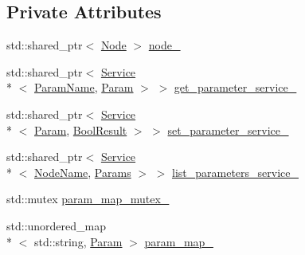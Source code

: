 \subsection*{Private Attributes}
\begin{DoxyCompactItemize}
\item 
std\-::shared\-\_\-ptr$<$ \hyperlink{classapollo_1_1cyber_1_1Node}{Node} $>$ \hyperlink{classapollo_1_1cyber_1_1ParameterServer_aff97f5c8d606d874176a4a547be55a8b}{node\-\_\-}
\item 
std\-::shared\-\_\-ptr$<$ \hyperlink{classapollo_1_1cyber_1_1Service}{Service}\\*
$<$ \hyperlink{classapollo_1_1cyber_1_1ParameterServer_a9a36f8371c476a478cbce477c443aa16}{Param\-Name}, \hyperlink{classapollo_1_1cyber_1_1ParameterServer_aabdbb6b8047a5748cb9e4f336650e303}{Param} $>$ $>$ \hyperlink{classapollo_1_1cyber_1_1ParameterServer_adf90630f82004589b443f9c24b66f230}{get\-\_\-parameter\-\_\-service\-\_\-}
\item 
std\-::shared\-\_\-ptr$<$ \hyperlink{classapollo_1_1cyber_1_1Service}{Service}\\*
$<$ \hyperlink{classapollo_1_1cyber_1_1ParameterServer_aabdbb6b8047a5748cb9e4f336650e303}{Param}, \hyperlink{classapollo_1_1cyber_1_1ParameterServer_a603661a34f7d6cff05fb6cf5618b96b9}{Bool\-Result} $>$ $>$ \hyperlink{classapollo_1_1cyber_1_1ParameterServer_a2f6c6c91e98fd38bbc3dfdbee24746d3}{set\-\_\-parameter\-\_\-service\-\_\-}
\item 
std\-::shared\-\_\-ptr$<$ \hyperlink{classapollo_1_1cyber_1_1Service}{Service}\\*
$<$ \hyperlink{classapollo_1_1cyber_1_1ParameterServer_ac7ab499bb218b50675bb950b500bbae8}{Node\-Name}, \hyperlink{classapollo_1_1cyber_1_1ParameterServer_adc6130bafd919f927f669737307a12d1}{Params} $>$ $>$ \hyperlink{classapollo_1_1cyber_1_1ParameterServer_a64f0850ba2189ecf105e0e9cf14bde94}{list\-\_\-parameters\-\_\-service\-\_\-}
\item 
std\-::mutex \hyperlink{classapollo_1_1cyber_1_1ParameterServer_aa18f1fc802ab7bef852a7c4f37d18b1d}{param\-\_\-map\-\_\-mutex\-\_\-}
\item 
std\-::unordered\-\_\-map\\*
$<$ std\-::string, \hyperlink{classapollo_1_1cyber_1_1ParameterServer_aabdbb6b8047a5748cb9e4f336650e303}{Param} $>$ \hyperlink{classapollo_1_1cyber_1_1ParameterServer_acad7d9ac54e984ba5e857366b4c80e7e}{param\-\_\-map\-\_\-}
\end{DoxyCompactItemize}


